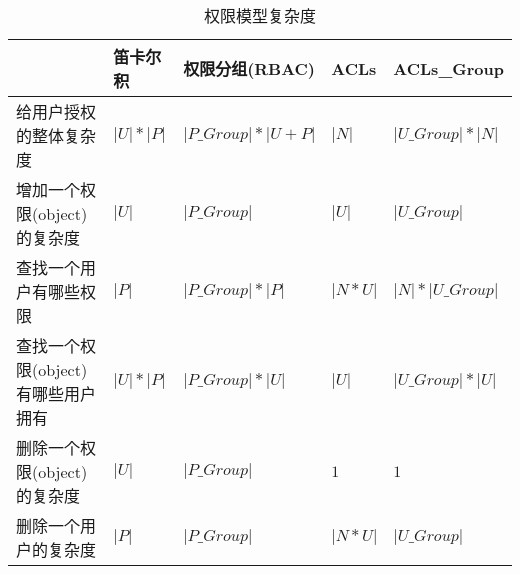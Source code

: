 \documentclass{article}
\begin{document}
\begin{CJK*}{UTF8}{gbsn}


\begin{table}[]
\caption{权限模型复杂度}
\begin{tabular}{|l|l|l|l|l|} 
\hline
    & 笛卡尔积  &      权限分组(RBAC) & ACLs  &  ACLs\_Group   \\ 
\hline
给用户授权的整体复杂度   & $|U|*|P|$ & $|P\_Group| * |U + P|$ & $|N|$  & $|U\_Group| * |N|$  \\
增加一个权限(object)的复杂度 & $|U|$  & $|P\_Group|$  & $|U|$  & $|U\_Group|$   \\
查找一个用户有哪些权限      & $|P|$  &   $|P\_Group| * |P|$   & $|N * U|$  &   $|N| * |U\_Group|$ \\
查找一个权限(object)有哪些用户拥有    & $|U|*|P|$   &  $|P\_Group| * |U|$  & $|U|$  & $|U\_Group| * |U|$   \\
删除一个权限(object)的复杂度     &  $|U|$  &  $|P\_Group|$  &  $1$ & $1$  \\
删除一个用户的复杂度    &  $|P|$  &  $|P\_Group|$   & $|N*U|$  &  $|U\_Group|$  \\
\hline
\end{tabular}
\end{table}


\end{CJK*}
\end{document}
